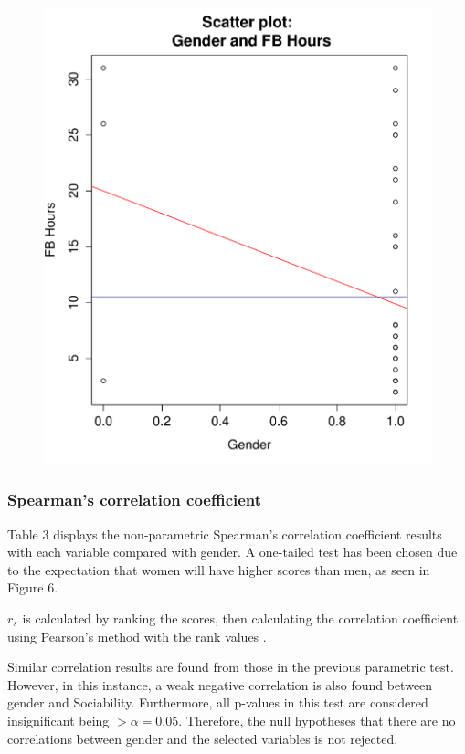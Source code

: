 \begin{figure}[H]
\includegraphics[scale=0.44]{./img/scatplot_fbhours.pdf}
\end{figure}

\newpage
\subsubsection{Spearman's correlation coefficient}

Table 3 displays the non-parametric Spearman's correlation coefficient results with each variable compared with gender. A one-tailed test has been chosen due to the expectation that women will have higher scores than men, as seen in Figure 6. 

$r_s$ is calculated by ranking the scores, then calculating the correlation coefficient using Pearson's method with the rank values \citep{McKillup2011}.

Similar correlation results are found from those in the previous parametric test. However, in this instance, a weak negative correlation is also found between gender and Sociability. Furthermore, all p-values in this test are considered insignificant being $> \alpha = 0.05$. Therefore, the null hypotheses that there are no correlations between gender and the selected variables is not rejected. 

